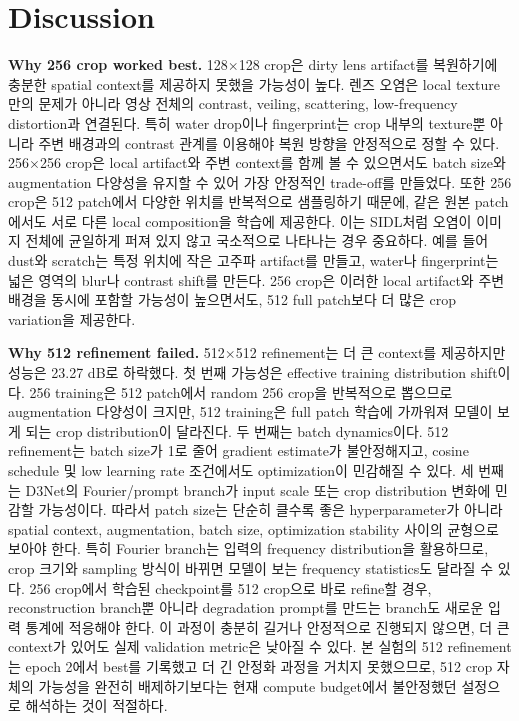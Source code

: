 \documentclass[10pt,a4paper]{article}
\begin{document}
\section{Discussion}
\textbf{Why 256 crop worked best.}
128$\times$128 crop은 dirty lens artifact를 복원하기에 충분한 spatial context를 제공하지 못했을 가능성이 높다.
렌즈 오염은 local texture만의 문제가 아니라 영상 전체의 contrast, veiling, scattering, low-frequency distortion과 연결된다.
특히 water drop이나 fingerprint는 crop 내부의 texture뿐 아니라 주변 배경과의 contrast 관계를 이용해야 복원 방향을 안정적으로 정할 수 있다.
256$\times$256 crop은 local artifact와 주변 context를 함께 볼 수 있으면서도 batch size와 augmentation 다양성을 유지할 수 있어 가장 안정적인 trade-off를 만들었다.
또한 256 crop은 512 patch에서 다양한 위치를 반복적으로 샘플링하기 때문에, 같은 원본 patch에서도 서로 다른 local composition을 학습에 제공한다.
이는 SIDL처럼 오염이 이미지 전체에 균일하게 퍼져 있지 않고 국소적으로 나타나는 경우 중요하다.
예를 들어 dust와 scratch는 특정 위치에 작은 고주파 artifact를 만들고, water나 fingerprint는 넓은 영역의 blur나 contrast shift를 만든다.
256 crop은 이러한 local artifact와 주변 배경을 동시에 포함할 가능성이 높으면서도, 512 full patch보다 더 많은 crop variation을 제공한다.

\textbf{Why 512 refinement failed.}
512$\times$512 refinement는 더 큰 context를 제공하지만 성능은 23.27 dB로 하락했다.
첫 번째 가능성은 effective training distribution shift이다.
256 training은 512 patch에서 random 256 crop을 반복적으로 뽑으므로 augmentation 다양성이 크지만, 512 training은 full patch 학습에 가까워져 모델이 보게 되는 crop distribution이 달라진다.
두 번째는 batch dynamics이다.
512 refinement는 batch size가 1로 줄어 gradient estimate가 불안정해지고, cosine schedule 및 low learning rate 조건에서도 optimization이 민감해질 수 있다.
세 번째는 D3Net의 Fourier/prompt branch가 input scale 또는 crop distribution 변화에 민감할 가능성이다.
따라서 patch size는 단순히 클수록 좋은 hyperparameter가 아니라 spatial context, augmentation, batch size, optimization stability 사이의 균형으로 보아야 한다.
특히 Fourier branch는 입력의 frequency distribution을 활용하므로, crop 크기와 sampling 방식이 바뀌면 모델이 보는 frequency statistics도 달라질 수 있다.
256 crop에서 학습된 checkpoint를 512 crop으로 바로 refine할 경우, reconstruction branch뿐 아니라 degradation prompt를 만드는 branch도 새로운 입력 통계에 적응해야 한다.
이 과정이 충분히 길거나 안정적으로 진행되지 않으면, 더 큰 context가 있어도 실제 validation metric은 낮아질 수 있다.
본 실험의 512 refinement는 epoch 2에서 best를 기록했고 더 긴 안정화 과정을 거치지 못했으므로, 512 crop 자체의 가능성을 완전히 배제하기보다는 현재 compute budget에서 불안정했던 설정으로 해석하는 것이 적절하다.
\end{document}
